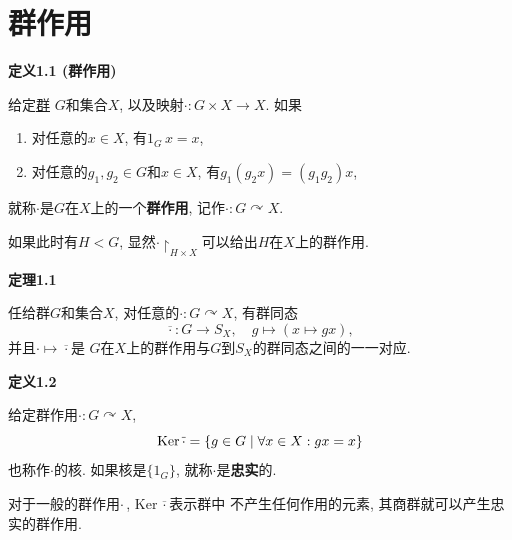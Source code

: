 \documentclass[UTF8]{ctexart}
\begin{document}
\setlength{\abovedisplayskip}{1pt}
\setlength{\belowdisplayskip}{1pt}

\section{群作用}


\hypertarget{sec:定义1.1}{}
\noindent\textbf{定义1.1 (群作用)}

给定\href{../01 群、子群与商群/01 半群与群#nameddest=sec:定义2.1}{群}
$G$和集合$X$, 以及映射$\cdot:G\times X\to X$. 如果
\begin{enumerate}
    \item 对任意的$x\in X$, 有$1_G\,x=x$,
    \item 对任意的$g_1,g_2\in G$和$x\in X$, 有$g_1(g_2x)=(g_1g_2)x$,
\end{enumerate}
就称$\cdot$是$G$在$X$上的一个\textbf{群作用}, 记作$\cdot:G\curvearrowright X$.


\vspace{10pt}

如果此时有$H<G$, 显然$\cdot\!\restriction_{H\times X}$可以给出$H$在$X$上的群作用.

\vspace{10pt}

\hypertarget{sec:定理1.1}{}
\noindent\textbf{定理1.1}

任给群$G$和集合$X$, 对任意的$\cdot:G\curvearrowright X$, 有群同态
\[
    \overline{\cdot}:G\to S_X,\quad g\mapsto(x\mapsto gx),
\]
并且$\cdot\mapsto\overline{\cdot}$是
$G$在$X$上的群作用与$G$到$S_X$的群同态之间的一一对应.

\vspace{10pt}

\hypertarget{sec:定义1.2}{}
\noindent\textbf{定义1.2}

给定群作用$\cdot:G\curvearrowright X$,
\[
    \mathrm{Ker}\,\overline{\cdot}=\{g\in G\mid\forall x\in X:gx=x\}\\[-3pt]
\]
也称作$\cdot$的核. 如果核是$\{1_G\}$, 就称$\cdot$是\textbf{忠实}的.

\vspace{10pt}

对于一般的群作用$\cdot$\,, $\mathrm{Ker}\,\overline{\cdot}$表示群中
不产生任何作用的元素, 其商群就可以产生忠实的群作用.
\end{document}
